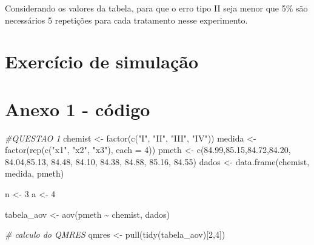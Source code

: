 \documentclass[
]{article}
\newenvironment{Shaded}{\begin{snugshade}}{\end{snugshade}}
\newcommand{\AttributeTok}[1]{\textcolor[rgb]{0.77,0.63,0.00}{#1}}
\newcommand{\CommentTok}[1]{\textcolor[rgb]{0.56,0.35,0.01}{\textit{#1}}}
\newcommand{\DecValTok}[1]{\textcolor[rgb]{0.00,0.00,0.81}{#1}}
\newcommand{\FloatTok}[1]{\textcolor[rgb]{0.00,0.00,0.81}{#1}}
\newcommand{\FunctionTok}[1]{\textcolor[rgb]{0.00,0.00,0.00}{#1}}
\newcommand{\NormalTok}[1]{#1}
\newcommand{\OtherTok}[1]{\textcolor[rgb]{0.56,0.35,0.01}{#1}}
\newcommand{\SpecialCharTok}[1]{\textcolor[rgb]{0.00,0.00,0.00}{#1}}
\newcommand{\StringTok}[1]{\textcolor[rgb]{0.31,0.60,0.02}{#1}}
\begin{document}
Considerando os valores da tabela, para que o erro tipo II seja menor
que 5\% são necessários 5 repetições para cada tratamento nesse
experimento.

\hypertarget{exercuxedcio-de-simulauxe7uxe3o}{%
\section{Exercício de simulação}\label{exercuxedcio-de-simulauxe7uxe3o}}

\hypertarget{anexo-1---cuxf3digo}{%
\section{Anexo 1 - código}\label{anexo-1---cuxf3digo}}

\begin{Shaded}
\begin{Highlighting}[]
\CommentTok{\#QUESTAO 1}
\NormalTok{chemist }\OtherTok{\textless{}{-}} \FunctionTok{factor}\NormalTok{(}\FunctionTok{c}\NormalTok{(}\StringTok{"I"}\NormalTok{, }\StringTok{"II"}\NormalTok{, }\StringTok{"III"}\NormalTok{, }\StringTok{"IV"}\NormalTok{))}
\NormalTok{medida }\OtherTok{\textless{}{-}} \FunctionTok{factor}\NormalTok{(}\FunctionTok{rep}\NormalTok{(}\FunctionTok{c}\NormalTok{(}\StringTok{"x1"}\NormalTok{, }\StringTok{"x2"}\NormalTok{, }\StringTok{"x3"}\NormalTok{), }\AttributeTok{each =} \DecValTok{4}\NormalTok{))}
\NormalTok{pmeth }\OtherTok{\textless{}{-}} \FunctionTok{c}\NormalTok{(}\FloatTok{84.99}\NormalTok{,}\FloatTok{85.15}\NormalTok{,}\FloatTok{84.72}\NormalTok{,}\FloatTok{84.20}\NormalTok{,}
           \FloatTok{84.04}\NormalTok{,}\FloatTok{85.13}\NormalTok{, }\FloatTok{84.48}\NormalTok{, }\FloatTok{84.10}\NormalTok{,}
           \FloatTok{84.38}\NormalTok{, }\FloatTok{84.88}\NormalTok{, }\FloatTok{85.16}\NormalTok{, }\FloatTok{84.55}\NormalTok{)}
\NormalTok{dados }\OtherTok{\textless{}{-}} \FunctionTok{data.frame}\NormalTok{(chemist, medida, pmeth)}

\NormalTok{n }\OtherTok{\textless{}{-}} \DecValTok{3}
\NormalTok{a }\OtherTok{\textless{}{-}} \DecValTok{4}

\NormalTok{tabela\_aov }\OtherTok{\textless{}{-}} \FunctionTok{aov}\NormalTok{(pmeth }\SpecialCharTok{\textasciitilde{}}\NormalTok{ chemist, dados)}

\CommentTok{\# calculo do QMRES}
\NormalTok{qmres }\OtherTok{\textless{}{-}} \FunctionTok{pull}\NormalTok{(}\FunctionTok{tidy}\NormalTok{(tabela\_aov)[}\DecValTok{2}\NormalTok{,}\DecValTok{4}\NormalTok{])}


\end{Highlighting}
\end{Shaded}
\end{document}
